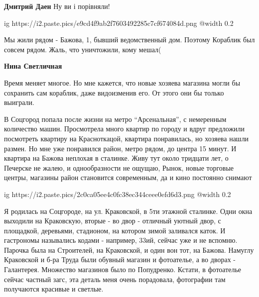 \begin{itemize}
\begin{itemize}
\begin{itemize}
\textbf{Дмитрий Даен} Ну ви і порівняли!
\end{itemize} %

\end{itemize} %


\ifcmt
  ig https://i2.paste.pics/e9cd4f9ab2f7603492285c7cf674084d.png
  @width 0.2
\fi


Мы жили рядом - Бажова, 1, бывший ведомственный дом. Поэтому Кораблик был совсем
рядом. Жаль, что уничтожили, кому мешал(

\begin{itemize} %
\textbf{Нина Светличная} 

Время меняет многое. Но мне кажется, что новые хозяева магазина могли бы
сохранить сам кораблик, даже видоизменив его. От этого они бы только выиграли.

\end{itemize} %


В Соцгород попала после жизни на метро \enquote{Арсенальная}, с немеренным количество
машин. Просмотрела много квартир по городу и вдруг предложили посмотреть
квартиру на Красноткацой, квартира понравилась, но хозяева нашли размен. Но мне
уже понравился район, метро рядом, до центра 15 минут. И квартира на Бажова
неплохая в сталинке. Живу тут около тридцати лет, о Печерске не жалею, и
однообразности не ощущаю, Рынок, новые торговые центры, магазины район
становится современным, да и кино постоянно снимают


\ifcmt
  ig https://i2.paste.pics/2c0ca05ee4c0fc38ec344ceee0efd6d3.png
  @width 0.2
\fi


Я родилась на Соцгороде, на ул. Краковской, в 5ти этажной сталинке. Одни окна
выходили на Краковскую, вторые - во двор - отличный уютный двор, с площадкой,
деревьями, стадионом, на котором зимой заливался каток. И гастрономы назывались
кодами - например, 33ий, сейчас уже и не вспомню. Парочка была на Строителей,
на Краковской, и один вон тот, на Бажова. Намуглу Краковской и б-ра Труда были
обувный магазин и фотоателье, а во дворах - Галантерея. Множество магазинов
было по Попудренко. Кстати, в фотоателье сейчас частный загс, эта деталь меня
очень порадовала, фотографии там получаются красивые и светлые.



\end{itemize}
